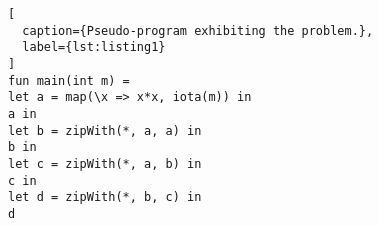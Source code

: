 \begin{lstlisting}[
  caption={Pseudo-program exhibiting the problem.},
  label={lst:listing1}
]
fun main(int m) =
let a = map(\x => x*x, iota(m)) in
a in
let b = zipWith(*, a, a) in
b in
let c = zipWith(*, a, b) in
c in
let d = zipWith(*, b, c) in
d
\end{lstlisting}


